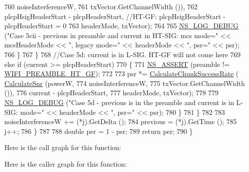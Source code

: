 \begin{DoxyCode}
760                                                                   noiseInterferenceW,
761                                                                   txVector.GetChannelWidth ()),
762                                                     plcpHsigHeaderStart - plcpHeaderStart, \textcolor{comment}{//HT-GF:
       plcpHsigHeaderStart - plcpHeaderStart = 0}
763                                                     headerMode, txVector);
764 
765                   \hyperlink{group__logging_ga413f1886406d49f59a6a0a89b77b4d0a}{NS\_LOG\_DEBUG} (\textcolor{stringliteral}{"Case 5cii - previous in preamble and current in HT-SIG: mcs
       mode="} << mcsHeaderMode << \textcolor{stringliteral}{", legacy mode="} << headerMode << \textcolor{stringliteral}{", psr="} << psr);
766                 \}
767             \}
768           \textcolor{comment}{//Case 5d: current is in L-SIG. HT-GF will not come here}
769           \textcolor{keywordflow}{else} \textcolor{keywordflow}{if} (current >= plcpHeaderStart)
770             \{
771               \hyperlink{assert_8h_a6dccdb0de9b252f60088ce281c49d052}{NS\_ASSERT} (preamble != \hyperlink{group__wifi_gga5e94a56cb338a14ffbbb19c6a41251eba82e0b00d79c1f01b7a6e46b693bafd72}{WIFI\_PREAMBLE\_HT\_GF});
772 
773               psr *= \hyperlink{classns3_1_1InterferenceHelper_ab1c34c3f7ecef1e37ec778c0cf0e9cef}{CalculateChunkSuccessRate} (
      \hyperlink{classns3_1_1InterferenceHelper_a8f6192d041874595004c007c5a519b4b}{CalculateSnr} (powerW,
774                                                               noiseInterferenceW,
775                                                               txVector.GetChannelWidth ()),
776                                                 current - plcpHeaderStart,
777                                                 headerMode, txVector);
778 
779               \hyperlink{group__logging_ga413f1886406d49f59a6a0a89b77b4d0a}{NS\_LOG\_DEBUG} (\textcolor{stringliteral}{"Case 5d - previous is in the preamble and current is in L-SIG:
       mode="} << headerMode << \textcolor{stringliteral}{", psr="} << psr);
780             \}
781         \}
782 
783       noiseInterferenceW += (*j).GetDelta ();
784       previous = (*j).GetTime ();
785       j++;
786     \}
787 
788   \textcolor{keywordtype}{double} per = 1 - psr;
789   \textcolor{keywordflow}{return} per;
790 \}
\end{DoxyCode}


Here is the call graph for this function\+:




Here is the caller graph for this function\+:


